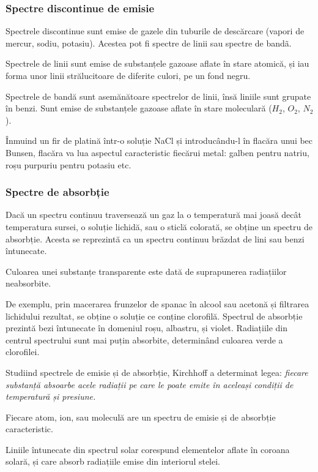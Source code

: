 \subsubsection{Spectre discontinue de emisie}

Spectrele discontinue sunt emise de gazele din tuburile de descărcare (vapori
de mercur, sodiu, potasiu). Acestea pot fi spectre de linii sau spectre de
bandã.

Spectrele de linii sunt emise de substanțele gazoase aflate în stare atomică,
și iau forma unor linii strălucitoare de diferite culori, pe un fond negru.

Spectrele de bandă sunt asemănătoare spectrelor de linii, însă liniile sunt
grupate în benzi. Sunt emise de substanțele gazoase aflate în stare moleculară
($H_2$, $O_2$, $N_2$).

Înmuind un fir de platină într-o soluție NaCl și introducându-l în flacăra unui
bec Bunsen, flacăra va lua aspectul caracteristic fiecărui metal: galben pentru
natriu, roșu purpuriu pentru potasiu etc.

\subsubsection{Spectre de absorbție}

Dacă un spectru continuu traversează un gaz la o temperatură mai joasă decât
temperatura sursei, o soluție lichidă, sau o sticlă colorată, se obține un
spectru de absorbție. Acesta se reprezintă ca un spectru continuu brăzdat de
lini sau benzi întunecate.

Culoarea unei substanțe transparente este dată de suprapunerea radiațiilor
neabsorbite.

De exemplu, prin macerarea frunzelor de spanac în alcool sau acetonă și
filtrarea lichidului rezultat, se obține o soluție ce conține clorofilă.
Spectrul de absorbție prezintă bezi întunecate în domeniul roșu, albastru, și
violet. Radiațiile din centrul spectrului sunt mai puțin absorbite, determinând
culoarea verde a clorofilei.

Studiind spectrele de emisie și de absorbție, Kirchhoff a determinat legea:
\emph{fiecare substanță absoarbe acele radiații pe care le poate emite în
aceleași condiții de temperatură și presiune.}

Fiecare atom, ion, sau moleculă are un spectru de emisie și de absorbție
caracteristic.

Liniile întunecate din spectrul solar corespund elementelor aflate în coroana
solară, și care absorb radiațiile emise din interiorul stelei.

